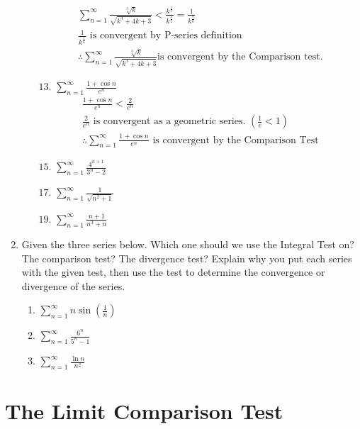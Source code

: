 \documentclass[12pt]{article}
\begin{document}
\begin{enumerate}
\begin{enumerate}
\begin{gather*}
            \sum^\infty_{n=1}\frac{\sqrt[3]{k}}{\sqrt{k^3+4k+3}}<\frac{k^\frac{1}{3}}{k^\frac{3}{2}}=\frac{1}{k^{\frac{7}{6}}}
            \\\text{$\frac{1}{k^{\frac{7}{6}}}$ is convergent by P-series definition}
            \\\text{$\therefore \sum^\infty_{n=1}\frac{\sqrt[3]{k}}{\sqrt{k^3+4k+3}} $is convergent by the Comparison test.}
        \end{gather*}
        \item[$13.$]$\sum^\infty_{n=1}\frac{1+\cos{n}}{e^n}$
        \begin{gather*}
            \frac{1+\cos{n}}{e^n} < \frac{2}{e^n}\\
            \text{$\frac{2}{e^n}$ is convergent as a geometric series. $\left(\frac{1}{e} < 1\right)$}
            \\\text{$\therefore \sum^\infty_{n=1}\frac{1+\cos{n}}{e^n}$ is convergent by the Comparison Test}
        \end{gather*}
        \item[$15.$]$\sum^\infty_{n=1}\frac{4^{n+1}}{3^n-2}$
        \item[$17.$]$\sum^\infty_{n=1}\frac{1}{\sqrt{n^2+1}}$
        \item[$19.$]$\sum^\infty_{n=1}\frac{n+1}{n^3+n}$
    \end{enumerate}
    \item Given the three series below. Which one should we use the Integral Test on? The comparison test? The divergence test? Explain why you put each series with the given test, then use the test to determine the convergence or divergence of the series.
    \begin{enumerate}
        \item $\sum^\infty_{n=1}n\sin(\frac{1}{n})$
        \item $\sum^\infty_{n=1}\frac{6^n}{5^n-1}$
        \item $\sum^\infty_{n=1}\frac{\ln n}{n^2}$
    \end{enumerate}
\end{enumerate}
\newpage\section{The Limit Comparison Test}
\end{document}
